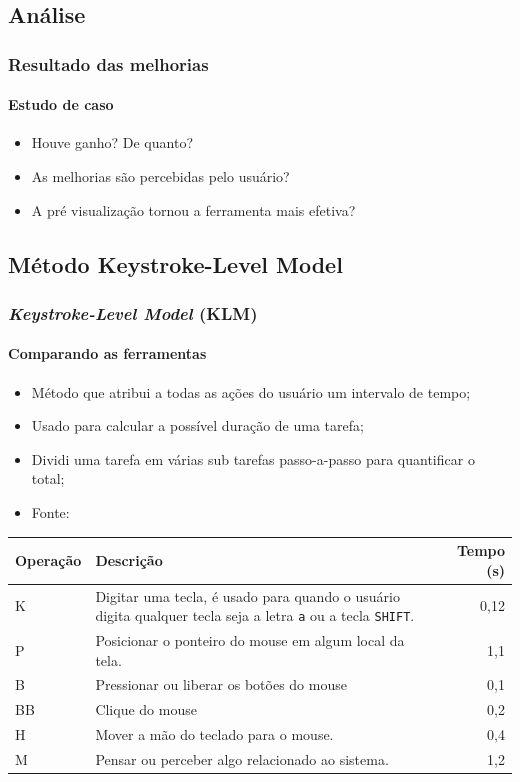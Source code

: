 \documentclass[]{beamer}
\begin{document}
   \subsection{Análise}
   \begin{frame}
      \frametitle{Resultado das melhorias}
      \framesubtitle{Estudo de caso}

      \begin{itemize}
         \item Houve ganho? De quanto?
         \item As melhorias são percebidas pelo usuário?
         \item A pré visualização tornou a ferramenta mais efetiva?
      \end{itemize}
   \end{frame}

   \subsection{Método Keystroke-Level Model}
   \begin{frame}
      \frametitle{\emph{Keystroke-Level Model} (KLM)}
      \framesubtitle{Comparando as ferramentas}

      \begin{itemize}
         \item Método que atribui a todas as ações do usuário um intervalo de tempo;
         \item Usado para calcular a possível duração de uma tarefa;
         \item Dividi uma tarefa em várias sub tarefas passo-a-passo para quantificar o total;
         \item Fonte: \cite{klm-def}
      \end{itemize}
   \end{frame}

   \begin{frame}
      \begin{center}
         \begin{tabular}{| l | p{18em} | r |}
            \hline
            \textbf{Operação} & \textbf{Descrição} & \textbf{Tempo (s)} \\
            \hline
            K & Digitar uma tecla, é usado para quando o usuário digita qualquer tecla seja a letra \texttt{a} ou a tecla \texttt{SHIFT}.  & 0,12 \\
            P & Posicionar o ponteiro do mouse em algum local da tela.  & 1,1  \\
            B & Pressionar ou liberar os botões do mouse & 0,1 \\
            BB & Clique do mouse & 0,2 \\
            H & Mover a mão do teclado para o mouse. & 0,4 \\
            M & Pensar ou perceber algo relacionado ao sistema. & 1,2 \\
            \hline
         \end{tabular}
      \end{center}
   \end{frame}
\end{document}
